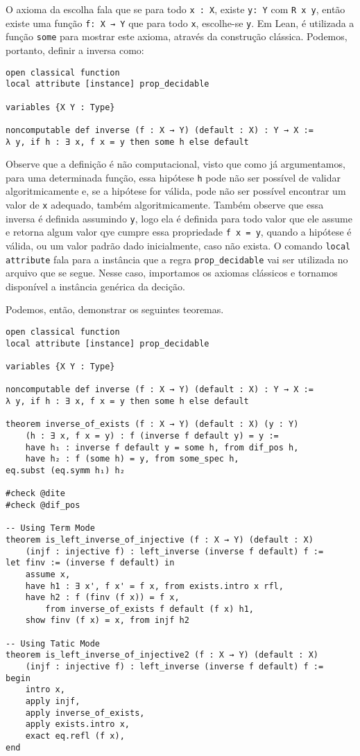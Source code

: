O axioma da escolha fala que se para todo \lstinline{x : X}, existe
\lstinline{y: Y} com \lstinline{R x y}, então existe uma função \lstinline{f: X → Y} que para todo \lstinline{x}, escolhe-se \lstinline{y}. Em Lean, é
utilizada a função \lstinline{some} para mostrar este axioma, através da
construção clássica. Podemos, portanto, definir a inversa como: 

\begin{lstlisting}
open classical function
local attribute [instance] prop_decidable

variables {X Y : Type}

noncomputable def inverse (f : X → Y) (default : X) : Y → X :=
λ y, if h : ∃ x, f x = y then some h else default   
\end{lstlisting}

Observe que a definição é não computacional, visto que como já argumentamos,
para uma determinada função, essa hipótese \lstinline{h} pode não ser possível
de validar algoritmicamente e, se a hipótese for válida, pode não ser possível
encontrar um valor de \lstinline{x} adequado, também algoritmicamente. Também
observe que essa inversa é definida assumindo \lstinline{y}, logo ela é
definida para todo valor que ele assume e retorna algum valor qye cumpre essa
propriedade \lstinline{f x = y}, quando a hipótese é válida, ou um valor
padrão dado inicialmente, caso não exista. O comando \lstinline{local attribute} 
fala para a instância que a regra \lstinline{prop_decidable} vai
ser utilizada no arquivo que se segue. Nesse caso, importamos os axiomas
clássicos e tornamos disponível a instância genérica da decição.   

Podemos, então, demonstrar os seguintes teoremas. 

\begin{lstlisting}
open classical function
local attribute [instance] prop_decidable

variables {X Y : Type}

noncomputable def inverse (f : X → Y) (default : X) : Y → X :=
λ y, if h : ∃ x, f x = y then some h else default

theorem inverse_of_exists (f : X → Y) (default : X) (y : Y)
    (h : ∃ x, f x = y) : f (inverse f default y) = y :=
    have h₁ : inverse f default y = some h, from dif_pos h,
    have h₂ : f (some h) = y, from some_spec h,
eq.subst (eq.symm h₁) h₂

#check @dite
#check @dif_pos 

-- Using Term Mode 
theorem is_left_inverse_of_injective (f : X → Y) (default : X)
    (injf : injective f) : left_inverse (inverse f default) f :=
let finv := (inverse f default) in
    assume x,
    have h1 : ∃ x', f x' = f x, from exists.intro x rfl,
    have h2 : f (finv (f x)) = f x, 
        from inverse_of_exists f default (f x) h1,
    show finv (f x) = x, from injf h2

-- Using Tatic Mode 
theorem is_left_inverse_of_injective2 (f : X → Y) (default : X)
    (injf : injective f) : left_inverse (inverse f default) f :=
begin 
    intro x,
    apply injf, 
    apply inverse_of_exists,
    apply exists.intro x,
    exact eq.refl (f x), 
end
\end{lstlisting}

